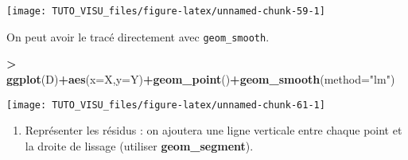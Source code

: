 \documentclass[]{book}
\newenvironment{Shaded}{\begin{snugshade}}{\end{snugshade}}
\newcommand{\DataTypeTok}[1]{\textcolor[rgb]{0.13,0.29,0.53}{#1}}
\newcommand{\DecValTok}[1]{\textcolor[rgb]{0.00,0.00,0.81}{#1}}
\newcommand{\KeywordTok}[1]{\textcolor[rgb]{0.13,0.29,0.53}{\textbf{#1}}}
\newcommand{\NormalTok}[1]{#1}
\newcommand{\OperatorTok}[1]{\textcolor[rgb]{0.81,0.36,0.00}{\textbf{#1}}}
\newcommand{\StringTok}[1]{\textcolor[rgb]{0.31,0.60,0.02}{#1}}
\providecommand{\tightlist}{%
  \setlength{\itemsep}{0pt}\setlength{\parskip}{0pt}}
\theoremstyle{definition}
\theoremstyle{definition}
\theoremstyle{definition}
\theoremstyle{remark}
\begin{document}
\begin{Shaded}
\end{Shaded}

\begin{center}\texttt{[image: TUTO\_VISU\_files/figure-latex/unnamed-chunk-59-1]} \end{center}

On peut avoir le tracé directement avec \texttt{geom\_smooth}.

\begin{Shaded}
\begin{Highlighting}[]
\OperatorTok{>}\StringTok{ }\KeywordTok{ggplot}\NormalTok{(D)}\OperatorTok{+}\KeywordTok{aes}\NormalTok{(}\DataTypeTok{x=}\NormalTok{X,}\DataTypeTok{y=}\NormalTok{Y)}\OperatorTok{+}\KeywordTok{geom_point}\NormalTok{()}\OperatorTok{+}\KeywordTok{geom_smooth}\NormalTok{(}\DataTypeTok{method=}\StringTok{"lm"}\NormalTok{)}
\end{Highlighting}
\end{Shaded}

\begin{center}\texttt{[image: TUTO\_VISU\_files/figure-latex/unnamed-chunk-61-1]} \end{center}

\begin{enumerate}
\def\labelenumi{\arabic{enumi}.}
\setcounter{enumi}{2}
\tightlist
\item
  Représenter les résidus : on ajoutera une ligne verticale entre chaque point et la droite de lissage (utiliser \textbf{geom\_segment}).
\end{enumerate}
\end{document}
